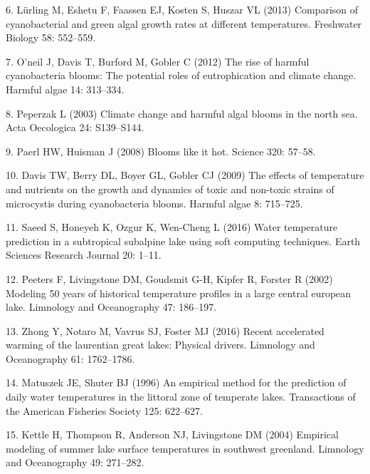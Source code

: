 \documentclass[
]{article}
\begin{document}
\leavevmode\hypertarget{ref-lurling2013comparison}{}%
6. Lürling M, Eshetu F, Faassen EJ, Kosten S, Huszar VL (2013)
Comparison of cyanobacterial and green algal growth rates at different
temperatures. Freshwater Biology 58: 552--559.

\leavevmode\hypertarget{ref-o2012rise}{}%
7. O'neil J, Davis T, Burford M, Gobler C (2012) The rise of harmful
cyanobacteria blooms: The potential roles of eutrophication and climate
change. Harmful algae 14: 313--334.

\leavevmode\hypertarget{ref-peperzak2003climate}{}%
8. Peperzak L (2003) Climate change and harmful algal blooms in the
north sea. Acta Oecologica 24: S139--S144.

\leavevmode\hypertarget{ref-paerl2008blooms}{}%
9. Paerl HW, Huisman J (2008) Blooms like it hot. Science 320: 57--58.

\leavevmode\hypertarget{ref-davis2009effects}{}%
10. Davis TW, Berry DL, Boyer GL, Gobler CJ (2009) The effects of
temperature and nutrients on the growth and dynamics of toxic and
non-toxic strains of microcystis during cyanobacteria blooms. Harmful
algae 8: 715--725.

\leavevmode\hypertarget{ref-saeed2016water}{}%
11. Saeed S, Honeyeh K, Ozgur K, Wen-Cheng L (2016) Water temperature
prediction in a subtropical subalpine lake using soft computing
techniques. Earth Sciences Research Journal 20: 1--11.

\leavevmode\hypertarget{ref-peeters2002modeling}{}%
12. Peeters F, Livingstone DM, Goudsmit G-H, Kipfer R, Forster R (2002)
Modeling 50 years of historical temperature profiles in a large central
european lake. Limnology and Oceanography 47: 186--197.

\leavevmode\hypertarget{ref-zhong2016recent}{}%
13. Zhong Y, Notaro M, Vavrus SJ, Foster MJ (2016) Recent accelerated
warming of the laurentian great lakes: Physical drivers. Limnology and
Oceanography 61: 1762--1786.

\leavevmode\hypertarget{ref-matuszek1996empirical}{}%
14. Matuszek JE, Shuter BJ (1996) An empirical method for the prediction
of daily water temperatures in the littoral zone of temperate lakes.
Transactions of the American Fisheries Society 125: 622--627.

\leavevmode\hypertarget{ref-kettle2004empirical}{}%
15. Kettle H, Thompson R, Anderson NJ, Livingstone DM (2004) Empirical
modeling of summer lake surface temperatures in southwest greenland.
Limnology and Oceanography 49: 271--282.
\end{document}
